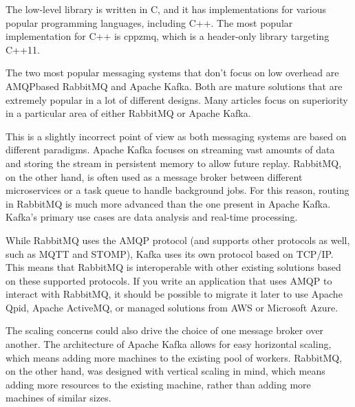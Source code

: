 The low-level library is written in C, and it has implementations for various popular programming languages, including C++. The most popular implementation for C++ is cppzmq, which is a header-only library targeting C++11.


The two most popular messaging systems that don't focus on low overhead are AMQPbased RabbitMQ and Apache Kafka. Both are mature solutions that are extremely popular in a lot of different designs. Many articles focus on superiority in a particular area of either RabbitMQ or Apache Kafka.

This is a slightly incorrect point of view as both messaging systems are based on different paradigms. Apache Kafka focuses on streaming vast amounts of data and storing the stream in persistent memory to allow future replay. RabbitMQ, on the other hand, is often used as a message broker between different microservices or a task queue to handle background jobs. For this reason, routing in RabbitMQ is much more advanced than the one present in Apache Kafka. Kafka's primary use cases are data analysis and real-time processing.

While RabbitMQ uses the AMQP protocol (and supports other protocols as well, such as MQTT and STOMP), Kafka uses its own protocol based on TCP/IP. This means that RabbitMQ is interoperable with other existing solutions based on these supported protocols. If you write an application that uses AMQP to interact with RabbitMQ, it should be possible to migrate it later to use Apache Qpid, Apache ActiveMQ, or managed solutions from AWS or Microsoft Azure.

The scaling concerns could also drive the choice of one message broker over another. The architecture of Apache Kafka allows for easy horizontal scaling, which means adding more machines to the existing pool of workers. RabbitMQ, on the other hand, was designed with vertical scaling in mind, which means adding more resources to the existing machine, rather than adding more machines of similar sizes.














